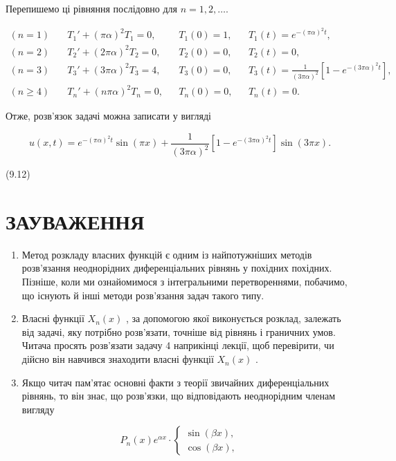 Перепишемо ці рівняння послідовно для \(n=1,2,\dots\).

\[
\begin{aligned}
(n=1)\quad & T_1' + (\pi\alpha)^2 T_1 = 0, && T_1(0) = 1, && T_1(t) = e^{-(\pi\alpha)^2 t}, \\
(n=2)\quad & T_2' + (2\pi\alpha)^2 T_2 = 0, && T_2(0) = 0, && T_2(t) = 0, \\
(n=3)\quad & T_3' + (3\pi\alpha)^2 T_3 = 4, && T_3(0) = 0, && T_3(t) = \frac{1}{(3\pi\alpha)^2}\left[1 - e^{-(3\pi\alpha)^2 t}\right], \\
(n\geqslant 4)\quad & T_n' + (n\pi\alpha)^2 T_n = 0, && T_n(0) = 0, && T_n(t) = 0.
\end{aligned}
\]

Отже, розв'язок задачі можна записати у вигляді

\[u(x, t) = e^{-(\pi\alpha)^2 t} \sin(\pi x) + \frac{1}{(3\pi\alpha)^2} [1 - e^{-(3\pi\alpha)^2 t}] \sin(3\pi x).\]

(9.12)

\section{ЗАУВАЖЕННЯ}\label{ux437ux430ux443ux432ux430ux436ux435ux43dux43dux44f-6}

\begin{enumerate}
\def\labelenumi{\arabic{enumi}.}
\item
  Метод розкладу власних функцій є одним із найпотужніших методів розв'язання неоднорідних диференціальних рівнянь у похідних похідних. Пізніше, коли ми ознайомимося з інтегральними перетвореннями, побачимо, що існують й інші методи розв'язання задач такого типу.
\item
  Власні функції \(X_n(x)\) , за допомогою якої виконується розклад, залежать від задачі, яку потрібно розв'язати, точніше від рівнянь і граничних умов. Читача просять розв'язати задачу 4 наприкінці лекції, щоб перевірити, чи дійсно він навчився знаходити власні функції \(X_n(x)\) .
\item
  Якщо читач пам'ятає основні факти з теорії звичайних диференціальних рівнянь, то він знає, що розв'язки, що відповідають неоднорідним членам вигляду
\end{enumerate}

\[
P_n(x) e^{\alpha x} \cdot
\begin{cases} \sin{(\beta x)}, \\ \cos{(\beta x)}, \end{cases}
\]

